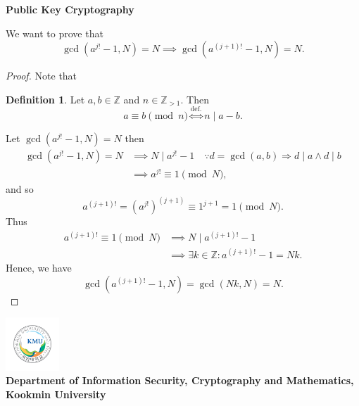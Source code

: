 \documentclass{article}
\newcommand{\footer}[1]{
\begin{flushright}
	\vspace{2em}
	\includegraphics[width=2cm]{school_logo.jpg} \\
	\vspace{1em}
	\textcolor{blue2}{\small\textbf{#1}}
\end{flushright}
}
\theoremstyle{definition}
\newtheorem*{definition*}{Definition}
\newcommand{\Z}{\mathbb{Z}}
\newcommand{\of}[1]{\left( #1 \right)}
\begin{document}
\begin{center}
	\huge\textbf{Public Key Cryptography}\\
	\vspace{0.5em}
\end{center}


\noindent We want to prove that \[
\gcd\of{a^{j!}-1,N}=N\implies\gcd\of{a^{(j+1)!}-1,N}=N.
\]
\begin{proof}
	Note that
	\begin{tcolorbox}[colback=white,colframe=defcolor,arc=5pt,title={\hypertarget{lem}{}\color{white}\bf }]
		\begin{definition*}
			Let $a,b\in\Z$ and $n\in\Z_{>1}$. Then \[
			a\equiv b\pmod{n}\overset{\text{def.}}{\iff} n\mid a-b.
			\]
		\end{definition*}
	\end{tcolorbox}
	
	\noindent Let $\gcd\of{a^{j!}-1,N}=N$ then \begin{align*}
		\gcd\of{a^{j!}-1,N}=N&\implies N\mid a^{j!}-1\quad\because d=\gcd(a,b)\Rightarrow d\mid a\land d\mid b\\
		&\implies a^{j!}\equiv 1\pmod{N},
	\end{align*} and so \[
	a^{(j+1)!}=\of{a^{j!}}^{(j+1)}\equiv 1^{j+1}=1\pmod{N}.
	\] Thus \begin{align*}
		a^{(j+1)!}\equiv 1\pmod{N}
		&\implies N\mid a^{(j+1)!}-1\\
		&\implies \exists k\in\Z:a^{(j+1)!}-1=Nk.
	\end{align*} Hence, we have \[
	\gcd\of{a^{(j+1)!}-1,N}=\gcd\of{Nk,N}=N.
\]
\end{proof}

\footer{Department of Information Security, Cryptography and Mathematics, Kookmin University}
\end{document}
